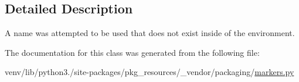 \subsection{Detailed Description}
\begin{DoxyVerb}A name was attempted to be used that does not exist inside of the
environment.
\end{DoxyVerb}
 

The documentation for this class was generated from the following file\+:\begin{DoxyCompactItemize}
\item 
venv/lib/python3./site-\/packages/pkg\+\_\+resources/\+\_\+vendor/packaging/\hyperlink{pkg__resources_2__vendor_2packaging_2markers_8py}{markers.\+py}\end{DoxyCompactItemize}
